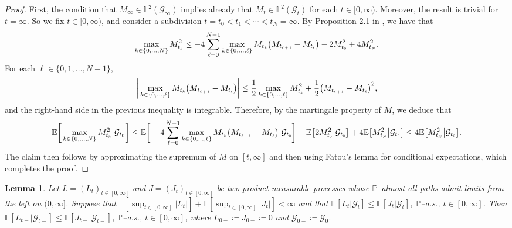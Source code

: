 \documentclass[10pt]{article} %
\newtheorem{lemma}[theorem]{Lemma}
\newcommand\cG{\mathcal G}
\newcommand{\smalltext}[1]{\text{\fontsize{4}{4}\selectfont$#1$}}
\def \E{\mathbb{E}}
\def \L{\mathbb{L}}
\def \P{\mathbb{P}}
\newcommand{\1}{\mathbf{1}}
\begin{document}
\begin{proof}
	First, the condition that $M_\infty \in \L^2(\cG_\infty)$ implies already that $M_t \in \L^2(\cG_t)$ for each $t \in [0,\infty)$. Moreover, the result is trivial for $t = \infty$. So we fix $t \in [0,\infty)$, and consider a subdivision $t = t_0 < t_1 < \cdots  < t_N = \infty$. By Proposition 2.1 in \cite{acciaio2013trajectorial}, we have that
	\begin{equation*}
		\max_{k \in \{0,\ldots,N\}} M^2_{t_\smalltext{k}} \leq -4 \sum_{\ell = 0}^{N-1}  \max_{k \in \{0,\ldots,\ell\}} M_{t_\smalltext{k}} \big(M_{t_\smalltext{\ell+1}} - M_{t_\smalltext{\ell}}\big) - 2 M^2_{t_\smalltext{0}} + 4 M^2_{t_\smalltext{N}}.
	\end{equation*}
	For each $\ell \in \{0,1,\ldots,N-1\}$,
	\begin{equation*}
		\bigg|\max_{k \in \{0,\ldots,\ell\}} M_{t_\smalltext{k}} \big(M_{t_\smalltext{\ell+1}} - M_{t_\smalltext{\ell}}\big)\bigg| \leq \frac{1}{2}\max_{k \in \{0,\ldots,\ell\}} M^2_{t_\smalltext{k}} + \frac{1}{2}\big(M_{t_\smalltext{\ell+1}} - M_{t_\smalltext{\ell}}\big)^2,
	\end{equation*}
	and the right-hand side in the previous inequality is integrable. Therefore, by the martingale property of $M$, we deduce that
	\begin{align*}
		\E\bigg[ \max_{k \in \{0,\ldots,N\}} M^2_{t_\smalltext{k}} \bigg| \cG_{t_0} \bigg] \leq \E\bigg[ -4 \sum_{\ell = 0}^{N-1}  \max_{k \in \{0,\ldots,\ell\}} M_{t_\smalltext{k}} \big(M_{t_\smalltext{\ell+1}} - M_{t_\smalltext{\ell}}\big) \bigg| \cG_{t_\smalltext{0}} \bigg] - \E\big[ 2 M^2_{t_\smalltext{0}} \big| \cG_{t_\smalltext{0}}\big] + 4 \E\big[ M^2_{t_\smalltext{N}} \big| \cG_{t_\smalltext{0}} \big] \leq 4 \E\big[ M^2_{t_\smalltext{N}} \big| \cG_{t_\smalltext{0}} \big].
	\end{align*}
	The claim then follows by approximating the supremum of $M$ on $[t,\infty]$ and then using Fatou's lemma for conditional expectations, which completes the proof.
\end{proof}


\begin{lemma}\label{lem::increas_cond_mean}
	Let $L = (L_t)_{t \in [0,\infty]}$ and $J = (J_t)_{t\in[0,\infty]}$ be two product-measurable processes whose $\P$--almost all paths admit limits from the left on $(0,\infty]$. Suppose that $\E[\sup_{t \in [0,\infty]}|L_t|] + \E[\sup_{t \in [0,\infty]}|J_t|] < \infty$ and that $\E[L_t|\cG_t] \leq \E[J_t|\cG_t]$, $\P$--a.s., $t \in [0,\infty]$. Then $\E[L_{t-}|\cG_{t-}] \leq \E[J_{t-}|\cG_{t-}]$, $\P$--a.s., $t \in [0,\infty]$, where $L_{0-} \coloneqq J_{0-} \coloneqq 0$ and $\cG_{0-} \coloneqq \cG_0$.
\end{lemma}
\end{document}
